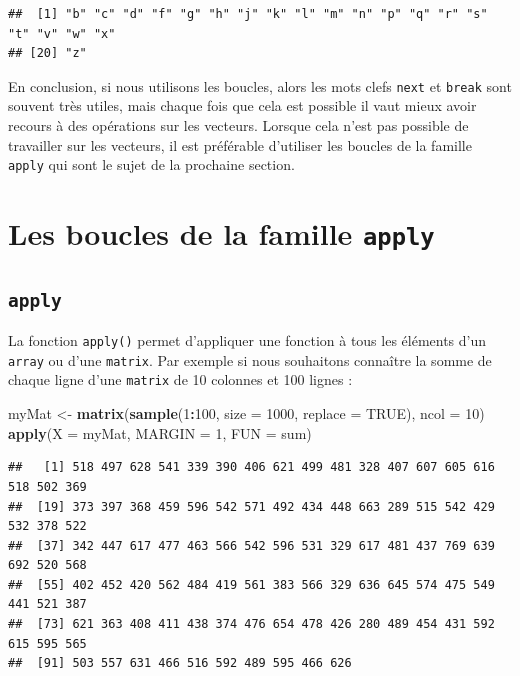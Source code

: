 \documentclass[
]{book}
\newenvironment{Shaded}{\begin{snugshade}}{\end{snugshade}}
\newcommand{\DataTypeTok}[1]{\textcolor[rgb]{0.13,0.29,0.53}{#1}}
\newcommand{\DecValTok}[1]{\textcolor[rgb]{0.00,0.00,0.81}{#1}}
\newcommand{\KeywordTok}[1]{\textcolor[rgb]{0.13,0.29,0.53}{\textbf{#1}}}
\newcommand{\NormalTok}[1]{#1}
\newcommand{\OperatorTok}[1]{\textcolor[rgb]{0.81,0.36,0.00}{\textbf{#1}}}
\newcommand{\OtherTok}[1]{\textcolor[rgb]{0.56,0.35,0.01}{#1}}
\newcommand{\StringTok}[1]{\textcolor[rgb]{0.31,0.60,0.02}{#1}}
\begin{document}
\begin{verbatim}
##  [1] "b" "c" "d" "f" "g" "h" "j" "k" "l" "m" "n" "p" "q" "r" "s" "t" "v" "w" "x"
## [20] "z"
\end{verbatim}

En conclusion, si nous utilisons les boucles, alors les mots clefs \texttt{next} et \texttt{break} sont souvent très utiles, mais chaque fois que cela est possible il vaut mieux avoir recours à des opérations sur les vecteurs. Lorsque cela n'est pas possible de travailler sur les vecteurs, il est préférable d'utiliser les boucles de la famille \texttt{apply} qui sont le sujet de la prochaine section.

\hypertarget{l17applyfamily}{%
\section{\texorpdfstring{Les boucles de la famille \texttt{apply}}{Les boucles de la famille apply}}\label{l17applyfamily}}

\hypertarget{l17apply}{%
\subsection{\texorpdfstring{\texttt{apply}}{apply}}\label{l17apply}}

La fonction \texttt{apply()} permet d'appliquer une fonction à tous les éléments d'un \texttt{array} ou d'une \texttt{matrix}. Par exemple si nous souhaitons connaître la somme de chaque ligne d'une \texttt{matrix} de 10 colonnes et 100 lignes :

\begin{Shaded}
\begin{Highlighting}[]
\NormalTok{myMat <-}\StringTok{ }\KeywordTok{matrix}\NormalTok{(}\KeywordTok{sample}\NormalTok{(}\DecValTok{1}\OperatorTok{:}\DecValTok{100}\NormalTok{, }\DataTypeTok{size =} \DecValTok{1000}\NormalTok{, }\DataTypeTok{replace =} \OtherTok{TRUE}\NormalTok{), }\DataTypeTok{ncol =} \DecValTok{10}\NormalTok{)}
\KeywordTok{apply}\NormalTok{(}\DataTypeTok{X =}\NormalTok{ myMat, }\DataTypeTok{MARGIN =} \DecValTok{1}\NormalTok{, }\DataTypeTok{FUN =}\NormalTok{ sum)}
\end{Highlighting}
\end{Shaded}

\begin{verbatim}
##   [1] 518 497 628 541 339 390 406 621 499 481 328 407 607 605 616 518 502 369
##  [19] 373 397 368 459 596 542 571 492 434 448 663 289 515 542 429 532 378 522
##  [37] 342 447 617 477 463 566 542 596 531 329 617 481 437 769 639 692 520 568
##  [55] 402 452 420 562 484 419 561 383 566 329 636 645 574 475 549 441 521 387
##  [73] 621 363 408 411 438 374 476 654 478 426 280 489 454 431 592 615 595 565
##  [91] 503 557 631 466 516 592 489 595 466 626
\end{verbatim}
\end{document}
